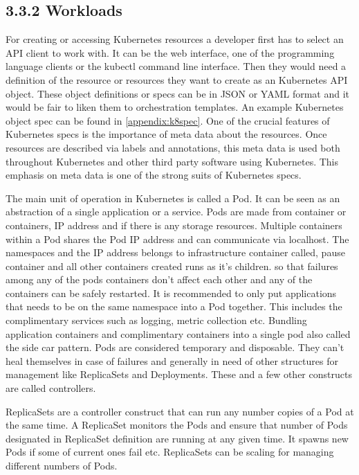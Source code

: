 \documentclass[12pt,oneandhalf,chaparabic,ceng,ms,eng,oneside,pntc]{gsufbe}
\begin{document}
\subsection[Workloads]{3.3.2 Workloads}
For creating or accessing Kubernetes resources a developer first has to select an API client to work
with.  It can be the web interface, one of the programming language clients or the kubectl command line
interface.  Then they would need a definition of the resource or resources they want to create as an
Kubernetes API object.  These object definitions or specs can be in JSON or YAML format and it would be
fair to liken them to orchestration templates.  An example Kubernetes object spec can be found in
\ref{appendix:k8spec}.  One of the crucial features of Kubernetes specs is the importance of meta data
about the resources.
Once resources are described via labels and annotations, this meta data is used both throughout 
Kubernetes and other third party software using Kubernetes. This emphasis on meta data is one of the strong
suits of Kubernetes specs.

The main unit of operation in Kubernetes is called a Pod.  It can be seen as an abstraction of a single
application or a service.  Pods are made from container or containers, IP address and if there is any
storage resources.  Multiple containers within a Pod shares the Pod IP address and can communicate via
localhost.  The namespaces and the IP address belongs to infrastructure container called, pause 
container and all other containers created runs as it’s children.  so that failures among any of the 
pods containers don't affect each other and any of the containers can be safely restarted.  
\cite{sayfan_mastering_2018} It is 
recommended to only put applications that needs to be on the same namespace into a Pod together.  This
includes the complimentary services such as logging, metric collection etc. Bundling application
containers and complimentary containers into a single pod also called the side car pattern.  Pods are
considered temporary and disposable.  They can’t heal themselves in case of failures and generally in
need of other structures for management like ReplicaSets and Deployments.  These and a few other
constructs are called controllers.

ReplicaSets are a controller construct that can run any number copies of a Pod at the same time.  A 
ReplicaSet monitors the Pods and ensure that number of Pods designated in ReplicaSet definition are
running at any given time.  It spawns new Pods if some of current ones fail etc. ReplicaSets can
be scaling for managing different numbers of Pods.  
\end{document}
